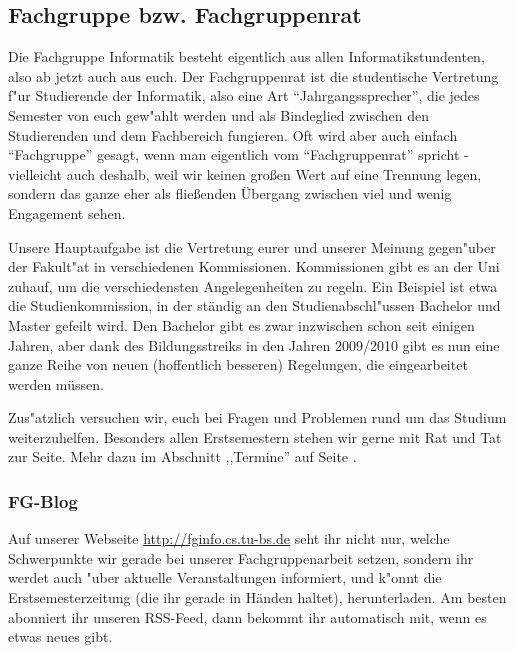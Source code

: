 \subsection{Fachgruppe bzw. Fachgruppenrat}
\label{fachgruppe}

Die Fachgruppe Informatik besteht eigentlich aus allen 
Informatikstundenten, also ab jetzt auch aus euch. Der Fachgruppenrat 
ist die studentische Vertretung f"ur Studierende der Informatik, also 
eine Art "`Jahrgangssprecher"', die jedes Semester von euch gew"ahlt werden 
und als Bindeglied zwischen den Studierenden und dem Fachbereich 
fungieren. Oft wird aber auch einfach "`Fachgruppe"' gesagt, wenn man 
eigentlich vom "`Fachgruppenrat"' spricht - vielleicht auch deshalb, 
weil wir keinen großen Wert auf eine Trennung legen, sondern das ganze
eher als fließenden Übergang zwischen viel und wenig Engagement sehen.

Unsere Hauptaufgabe ist die Vertretung eurer und unserer Meinung 
gegen"uber der Fakult"at in verschiedenen Kommissionen. Kommissionen 
gibt es an der Uni zuhauf, um die verschiedensten Angelegenheiten zu 
regeln. Ein Beispiel ist etwa die Studienkommission, in der ständig 
an den Studienabschl"ussen Bachelor und Master gefeilt wird. Den Bachelor 
gibt es zwar inzwischen schon seit einigen Jahren, aber dank des 
Bildungsstreiks in den Jahren 2009/2010 gibt es nun eine ganze Reihe %
von neuen (hoffentlich besseren) Regelungen, die eingearbeitet werden 
müssen.

Zus"atzlich versuchen wir, euch bei Fragen und Problemen rund um das 
Studium weiterzuhelfen. Besonders allen Erstsemestern stehen wir 
gerne mit Rat und Tat zur Seite.  Mehr dazu im Abschnitt ,,Termine'' auf
Seite \pageref{termine}.

\subsubsection*{FG-Blog}

Auf unserer Webseite \url{http://fginfo.cs.tu-bs.de} seht ihr nicht 
nur, welche Schwerpunkte wir gerade bei unserer Fachgruppenarbeit setzen, 
sondern ihr werdet auch "uber aktuelle Veranstaltungen informiert, und k"onnt 
die Erstsemesterzeitung (die ihr gerade in Händen haltet), herunterladen. 
Am besten abonniert ihr unseren RSS-Feed, dann bekommt ihr automatisch 
mit, wenn es etwas neues gibt.

